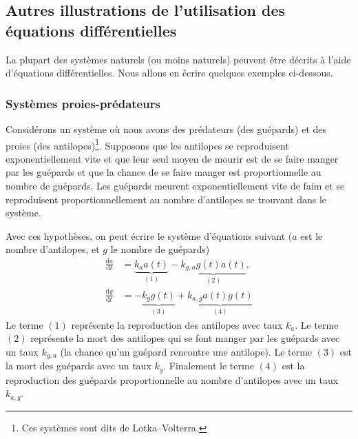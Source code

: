 \documentclass[a4paper,12pt]{book}
\newcommand{\dd}{\mathrm{d}}
\begin{document}
\subsection{Autres illustrations de l'utilisation des équations différentielles}

La plupart des systèmes naturels (ou moins naturels) peuvent être décrits à l'aide d'équations différentielles.
Nous allons en écrire quelques exemples ci-dessous.

\subsubsection{Systèmes proies-prédateurs}

Considérons un système où nous avons des prédateurs (des guépards) et des proies (des antilopes)\footnote{Ces systèmes sont dits de Lotka--Volterra.}. 
Supposons que les antilopes se reproduisent exponentiellement vite et que leur seul moyen de mourir 
est de se faire manger par les guépards et que la chance de se faire manger est proportionnelle au nombre de guépards. 
Les guépards meurent exponentiellement vite de faim et se reproduisent 
proportionnellement au nombre d'antilopes se trouvant dans le système. 

Avec ces hypothèses, on peut écrire le système d'équations suivant ($a$ est le nombre d'antilopes, et $g$ le nombre de guépards)
\begin{align*}
\frac{\dd a}{\dd t}&= \underbrace{k_a a(t)}_{(1)}-\underbrace{k_{g,a}g(t) a(t)}_{(2)},\\
\frac{\dd g}{\dd t}&= -\underbrace{k_g g(t)}_{(3)} +\underbrace{k_{a,g} a(t)g(t)}_{(4)}
\end{align*}
Le terme $(1)$ représente la reproduction des antilopes avec taux $k_a$. Le terme $(2)$ représente la mort des antilopes qui se font manger par les guépards
avec un taux $k_{g,a}$ (la chance qu'un guépard rencontre une antilope).
Le terme $(3)$ est la mort des guépards avec un taux $k_g$. Finalement le terme $(4)$ est la reproduction des guépards proportionnelle au nombre d'antilopes
avec un taux $k_{a,g}$.
\end{document}
